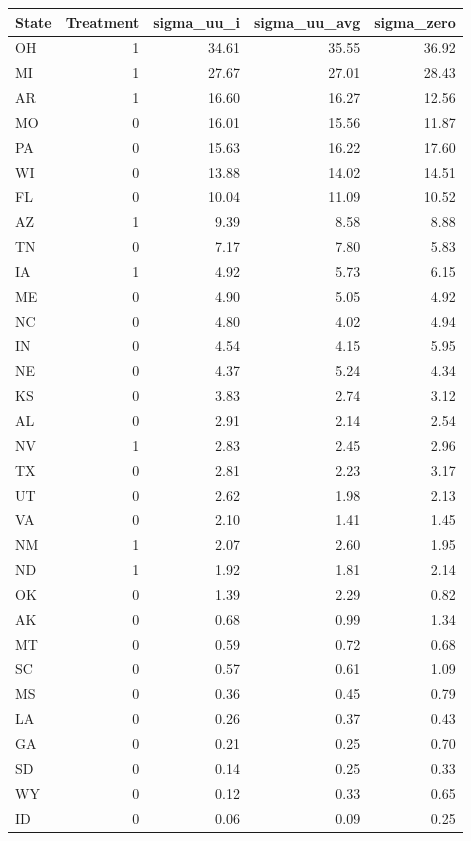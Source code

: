 \documentclass[12pt]{article}
\begin{document}
\begin{table}[ht]
\centering
\begin{tabular}{lrrrr}
  \toprule
State & Treatment & sigma\_uu\_i & sigma\_uu\_avg & sigma\_zero \\ 
  \midrule
OH & 1 & 34.61 & 35.55 & 36.92 \\ 
  MI & 1 & 27.67 & 27.01 & 28.43 \\ 
  AR & 1 & 16.60 & 16.27 & 12.56 \\ 
  MO & 0 & 16.01 & 15.56 & 11.87 \\ 
  PA & 0 & 15.63 & 16.22 & 17.60 \\ 
  WI & 0 & 13.88 & 14.02 & 14.51 \\ 
  FL & 0 & 10.04 & 11.09 & 10.52 \\ 
  AZ & 1 & 9.39 & 8.58 & 8.88 \\ 
  TN & 0 & 7.17 & 7.80 & 5.83 \\ 
  IA & 1 & 4.92 & 5.73 & 6.15 \\ 
  ME & 0 & 4.90 & 5.05 & 4.92 \\ 
  NC & 0 & 4.80 & 4.02 & 4.94 \\ 
  IN & 0 & 4.54 & 4.15 & 5.95 \\ 
  NE & 0 & 4.37 & 5.24 & 4.34 \\ 
  KS & 0 & 3.83 & 2.74 & 3.12 \\ 
  AL & 0 & 2.91 & 2.14 & 2.54 \\ 
  NV & 1 & 2.83 & 2.45 & 2.96 \\ 
  TX & 0 & 2.81 & 2.23 & 3.17 \\ 
  UT & 0 & 2.62 & 1.98 & 2.13 \\ 
  VA & 0 & 2.10 & 1.41 & 1.45 \\ 
  NM & 1 & 2.07 & 2.60 & 1.95 \\ 
  ND & 1 & 1.92 & 1.81 & 2.14 \\ 
  OK & 0 & 1.39 & 2.29 & 0.82 \\ 
  AK & 0 & 0.68 & 0.99 & 1.34 \\ 
  MT & 0 & 0.59 & 0.72 & 0.68 \\ 
  SC & 0 & 0.57 & 0.61 & 1.09 \\ 
  MS & 0 & 0.36 & 0.45 & 0.79 \\ 
  LA & 0 & 0.26 & 0.37 & 0.43 \\ 
  GA & 0 & 0.21 & 0.25 & 0.70 \\ 
  SD & 0 & 0.14 & 0.25 & 0.33 \\ 
  WY & 0 & 0.12 & 0.33 & 0.65 \\ 
  ID & 0 & 0.06 & 0.09 & 0.25 \\ 

\end{tabular}
\end{table}
\end{document}
